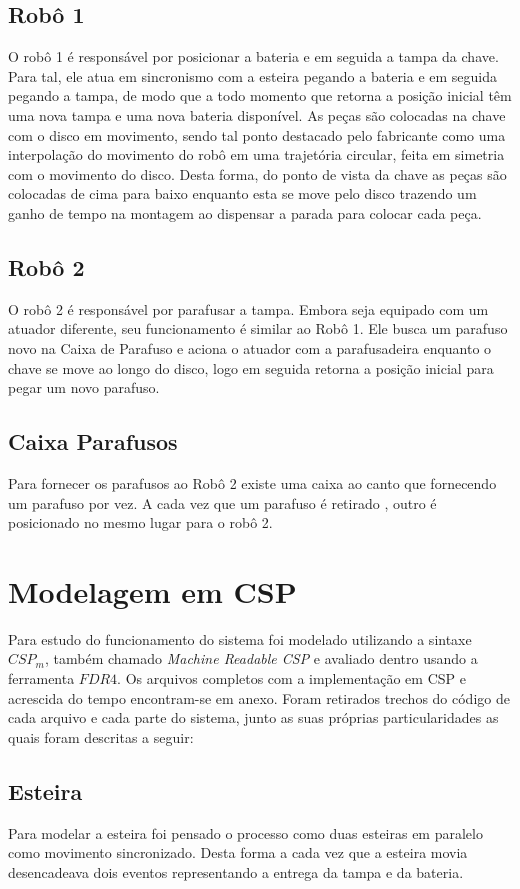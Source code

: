 \documentclass[a4paper,11pt,twocolumns]{article}
\begin{document}
\subsection{Robô 1}
O robô 1 é responsável por posicionar a bateria e em seguida a tampa da chave. Para tal, ele atua em sincronismo com a esteira pegando a bateria e em seguida pegando a tampa, de modo que a todo momento que retorna a posição inicial têm uma nova tampa e uma nova bateria disponível. As peças são colocadas na chave com o disco em movimento, sendo tal ponto destacado pelo fabricante como uma interpolação do movimento do robô em uma trajetória circular, feita em simetria com o movimento do disco. Desta forma, do ponto de vista da chave as peças são colocadas de cima para baixo enquanto esta se move pelo disco trazendo um ganho de tempo na montagem ao dispensar a parada para colocar cada peça.

\subsection{Robô 2}

O robô 2 é responsável por parafusar a tampa. Embora seja equipado com um atuador diferente, seu funcionamento é similar ao Robô 1. Ele busca um parafuso novo na Caixa de Parafuso e aciona o atuador com a parafusadeira enquanto o chave se move ao longo do disco, logo em seguida retorna a posição inicial para pegar um novo parafuso.

\subsection{Caixa Parafusos}
Para fornecer os parafusos ao Robô 2 existe uma caixa ao canto que fornecendo um parafuso por vez. A cada vez que um parafuso é retirado , outro é posicionado no mesmo lugar para o robô 2.

\section{Modelagem em CSP}
Para estudo do funcionamento do sistema foi modelado utilizando a sintaxe $CSP_m$, também chamado \textit{Machine Readable CSP}\cite{fdrManual} e avaliado dentro usando a ferramenta $FDR4$. Os arquivos completos com a implementação em CSP e acrescida do tempo encontram-se em anexo. Foram retirados trechos do código de cada arquivo e  cada parte do sistema, junto as suas próprias particularidades as quais foram descritas a seguir:

\subsection{Esteira}
Para modelar a esteira foi pensado o processo como duas esteiras em paralelo como movimento sincronizado. Desta forma a cada vez que a esteira movia desencadeava dois eventos representando a entrega da tampa e da bateria.
\end{document}
